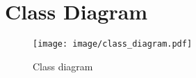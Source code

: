 \documentclass[11pt]{article}
\begin{document}
\section{Class Diagram}

\begin{figure}[tb]
 \centering
     {\texttt{[image: image/class\_diagram.pdf]}}
    \vspace{-2ex}
     \caption{\label{fig:class_diagram}  
        Class diagram
     }
\end{figure}



\end{document}
